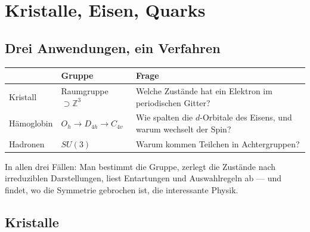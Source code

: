 \chapter{Kristalle, Eisen, Quarks}

\section{Drei Anwendungen, ein Verfahren}

\begin{merksatz}
\begin{center}
{\small
\renewcommand{\arraystretch}{1.5}
\begin{tabular}{@{}P{2.2cm}P{2.6cm}P{3.6cm}@{}}
\toprule
 & \textbf{Gruppe} & \textbf{Frage}\\
\midrule
Kristall & Raumgruppe $\supset\mathbb Z^{3}$ & Welche Zustände hat ein Elektron im periodischen Gitter?\\
Hämoglobin & $O_h\to D_{4h}\to C_{4v}$ & Wie spalten die $d$-Orbitale des Eisens, und warum wechselt der Spin?\\
Hadronen & $SU(3)$ & Warum kommen Teilchen in Achtergruppen?\\
\bottomrule
\end{tabular}}
\end{center}
In allen drei Fällen: Man bestimmt die Gruppe, zerlegt die Zustände nach irreduziblen Darstellungen, liest Entartungen und Auswahlregeln ab --- und findet, wo die Symmetrie gebrochen ist, die interessante Physik.

\begin{center}
\begin{minipage}{0.88\textwidth}
\end{minipage}
\end{center}
\end{merksatz}

\section{Kristalle}

